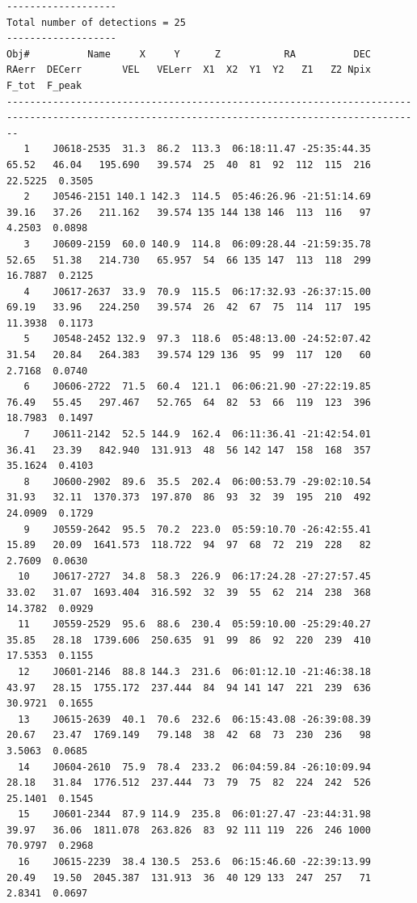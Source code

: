 \documentclass[12pt]{article}
\begin{document}
\begin{landscape}
{\begin{verbatim}
-------------------
Total number of detections = 25
-------------------
Obj#          Name     X     Y      Z           RA          DEC   RAerr  DECerr       VEL   VELerr  X1  X2  Y1  Y2   Z1   Z2 Npix   F_tot  F_peak
----------------------------------------------------------------------------------------------------------------------------------------------
   1    J0618-2535  31.3  86.2  113.3  06:18:11.47 -25:35:44.35   65.52   46.04   195.690   39.574  25  40  81  92  112  115  216 22.5225  0.3505
   2    J0546-2151 140.1 142.3  114.5  05:46:26.96 -21:51:14.69   39.16   37.26   211.162   39.574 135 144 138 146  113  116   97  4.2503  0.0898
   3    J0609-2159  60.0 140.9  114.8  06:09:28.44 -21:59:35.78   52.65   51.38   214.730   65.957  54  66 135 147  113  118  299 16.7887  0.2125
   4    J0617-2637  33.9  70.9  115.5  06:17:32.93 -26:37:15.00   69.19   33.96   224.250   39.574  26  42  67  75  114  117  195 11.3938  0.1173
   5    J0548-2452 132.9  97.3  118.6  05:48:13.00 -24:52:07.42   31.54   20.84   264.383   39.574 129 136  95  99  117  120   60  2.7168  0.0740
   6    J0606-2722  71.5  60.4  121.1  06:06:21.90 -27:22:19.85   76.49   55.45   297.467   52.765  64  82  53  66  119  123  396 18.7983  0.1497
   7    J0611-2142  52.5 144.9  162.4  06:11:36.41 -21:42:54.01   36.41   23.39   842.940  131.913  48  56 142 147  158  168  357 35.1624  0.4103
   8    J0600-2902  89.6  35.5  202.4  06:00:53.79 -29:02:10.54   31.93   32.11  1370.373  197.870  86  93  32  39  195  210  492 24.0909  0.1729
   9    J0559-2642  95.5  70.2  223.0  05:59:10.70 -26:42:55.41   15.89   20.09  1641.573  118.722  94  97  68  72  219  228   82  2.7609  0.0630
  10    J0617-2727  34.8  58.3  226.9  06:17:24.28 -27:27:57.45   33.02   31.07  1693.404  316.592  32  39  55  62  214  238  368 14.3782  0.0929
  11    J0559-2529  95.6  88.6  230.4  05:59:10.00 -25:29:40.27   35.85   28.18  1739.606  250.635  91  99  86  92  220  239  410 17.5353  0.1155
  12    J0601-2146  88.8 144.3  231.6  06:01:12.10 -21:46:38.18   43.97   28.15  1755.172  237.444  84  94 141 147  221  239  636 30.9721  0.1655
  13    J0615-2639  40.1  70.6  232.6  06:15:43.08 -26:39:08.39   20.67   23.47  1769.149   79.148  38  42  68  73  230  236   98  3.5063  0.0685
  14    J0604-2610  75.9  78.4  233.2  06:04:59.84 -26:10:09.94   28.18   31.84  1776.512  237.444  73  79  75  82  224  242  526 25.1401  0.1545
  15    J0601-2344  87.9 114.9  235.8  06:01:27.47 -23:44:31.98   39.97   36.06  1811.078  263.826  83  92 111 119  226  246 1000 70.9797  0.2968
  16    J0615-2239  38.4 130.5  253.6  06:15:46.60 -22:39:13.99   20.49   19.50  2045.387  131.913  36  40 129 133  247  257   71  2.8341  0.0697

\end{verbatim}}
\end{landscape}
\end{document}
